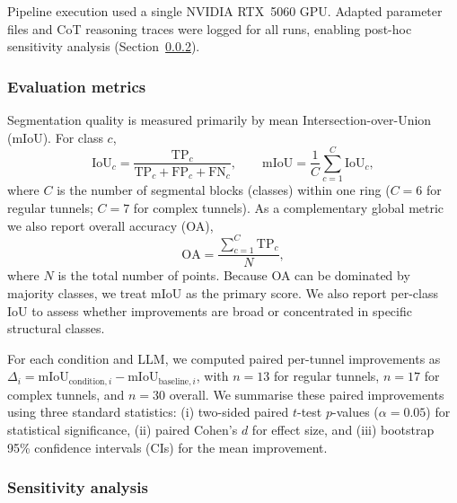 \documentclass[a4paper,fleqn]{cas-dc}
\begin{document}
{Pipeline execution used a single NVIDIA RTX~5060 GPU. Adapted parameter files and CoT reasoning traces were logged for all runs, enabling post-hoc sensitivity analysis (Section~\ref{sec:sensitivity-method}).

\subsubsection{Evaluation metrics}\label{sec:metrics}

Segmentation quality is measured primarily by mean Intersection-over-Union (mIoU). For class $c$,
\begin{equation}
\text{IoU}_c = \frac{\text{TP}_c}{\text{TP}_c + \text{FP}_c + \text{FN}_c}, \qquad
\text{mIoU} = \frac{1}{C} \sum_{c=1}^{C} \text{IoU}_c,
\end{equation}
where $C$ is the number of segmental blocks (classes) within one ring ($C=6$ for regular tunnels; $C=7$ for complex tunnels). As a complementary global metric we also report overall accuracy (OA),
\begin{equation}
\text{OA} = \frac{\sum_{c=1}^{C} \text{TP}_c}{N},
\end{equation}
where $N$ is the total number of points. Because OA can be dominated by majority classes, we treat mIoU as the primary score. We also report per-class IoU to assess whether improvements are broad or concentrated in specific structural classes.

For each condition and LLM, we computed paired per-tunnel improvements as $\Delta_i = \mathrm{mIoU}_{\text{condition},i} - \mathrm{mIoU}_{\text{baseline},i}$, with $n=13$ for regular tunnels, $n=17$ for complex tunnels, and $n=30$ overall. We summarise these paired improvements using three standard statistics: (i) two-sided paired $t$-test $p$-values ($\alpha = 0.05$) for statistical significance, (ii) paired Cohen's \mbox{$d$} for effect size, and (iii) bootstrap 95\% confidence intervals (CIs) for the mean improvement.

\subsubsection{Sensitivity analysis}\label{sec:sensitivity-method}

}
\end{document}
